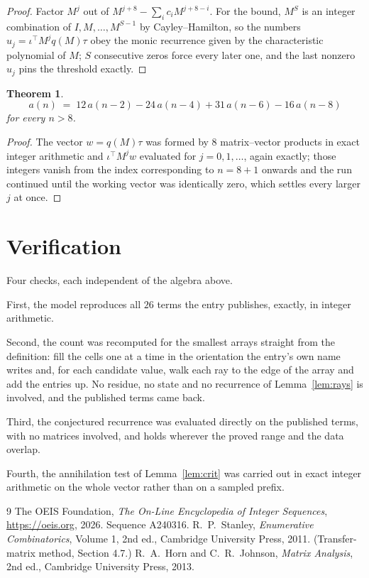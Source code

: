 \documentclass[11pt,a4paper]{article}
\theoremstyle{plain}
\newtheorem{theorem}{Theorem}
\theoremstyle{definition}
\begin{document}
\begin{proof}
Factor $M^{j}$ out of $M^{j+8}-\sum_ic_iM^{j+8-i}$. For the bound, $M^{S}$
is an integer combination of $I,M,\dots,M^{S-1}$ by Cayley--Hamilton, so the numbers
$u_j=\iota^{\!\top}M^{j}q(M)\tau$ obey the monic recurrence given by the characteristic
polynomial of $M$; $S$ consecutive zeros force every later one, and the last nonzero $u_j$
pins the threshold exactly.
\end{proof}

\begin{theorem}
\[
a(n)\;=\;12\,a(n-2) - 24\,a(n-4) + 31\,a(n-6) - 16\,a(n-8)
\]
for every $n>8$.
\end{theorem}

\begin{proof}
The vector $w=q(M)\tau$ was formed by $8$ matrix--vector products in exact integer
arithmetic and $\iota^{\!\top}M^{j}w$ evaluated for $j=0,1,\dots$, again exactly; those
integers vanish from the index corresponding to $n=8+1$ onwards and the run continued
until the working vector was identically zero, which settles every larger $j$ at once.
\end{proof}

\section{Verification}

Four checks, each independent of the algebra above.

First, the model reproduces all $26$ terms the entry publishes, exactly, in integer
arithmetic.

Second, the count was recomputed for the smallest arrays straight from the definition: fill the
cells one at a time in the orientation the entry's own name writes and, for each candidate
value, walk each ray to the edge of the array and add the entries up. No residue, no state and
no recurrence of Lemma~\ref{lem:rays} is involved, and the published terms came back.

Third, the conjectured recurrence was evaluated directly on the published terms, with no
matrices involved, and holds wherever the proved range and the data overlap.

Fourth, the annihilation test of Lemma~\ref{lem:crit} was carried out in exact integer
arithmetic on the whole vector rather than on a sampled prefix.

\begin{thebibliography}{9}
 The OEIS Foundation, \emph{The On-Line Encyclopedia of Integer
Sequences}, \url{https://oeis.org}, 2026. Sequence A240316.
 R.~P.~Stanley, \emph{Enumerative Combinatorics}, Volume 1, 2nd ed.,
Cambridge University Press, 2011. (Transfer-matrix method, Section 4.7.)
 R.~A.~Horn and C.~R.~Johnson, \emph{Matrix Analysis}, 2nd ed., Cambridge
University Press, 2013.
\end{thebibliography}
\end{document}
